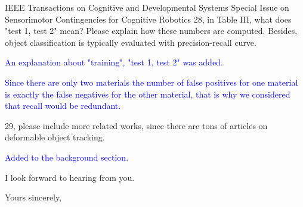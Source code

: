 \documentclass[a4paper,12pt]{letter}
\newcommand{\comment}[1]{\textcolor{blue}{#1}}
\begin{document}
\begin{letter}{IEEE Transactions on Cognitive and Developmental Systems\newline
Special Issue on Sensorimotor Contingencies for Cognitive Robotics}
28, in Table III, what does "test 1, test 2" mean? Please explain how these numbers are computed. Besides, object classification is typically evaluated with precision-recall curve.

\comment{An explanation about "training", "test 1, test 2" was added.}

\comment{Since there are only two materials the number of false positives for one material is exactly the false negatives for the other material, that is why we considered that recall would be redundant.}

29, please include more related works, since there are tons of articles on deformable object tracking.

\comment{Added to the background section.}


I look forward to hearing from you.


\signature{Dra. Verónica Esther Arriola Ríos\\
Profesora Asociada C de T.C.\newline
Departamento de Matemáticas, Cub 119.\newline
Facultad de Ciencias, UNAM \newline
v.arriola@ciencias.unam.mx \newline
+(52)55 5622 5426}

\closing{Yours sincerely,}


\end{letter}
\end{document}
